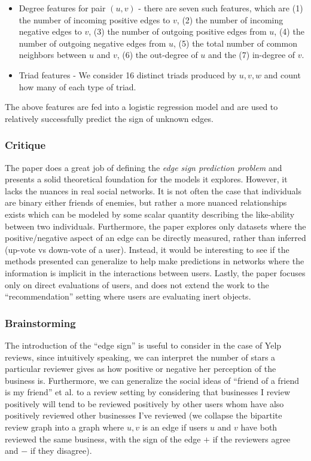 \documentclass[letterpaper, 11 pt, conference]{ieeeconf}  %
\begin{document}
\begin{itemize}
\item Degree features for pair $(u,v)$ - there are seven such features, which are (1) the number of incoming positive edges to $v$, (2) the number of incoming negative edges to $v$, (3) the number of outgoing positive edges from $u$, (4) the number of outgoing negative edges from $u$, (5) the total number of common neighbors between $u$ and $v$, (6) the out-degree of $u$ and the (7) in-degree of $v$.
\item Triad features - We consider 16 distinct triads produced by $u,v,w$ and count how many of each type of triad.
\end{itemize}

The above features are fed into a logistic regression model and are used to relatively successfully predict the sign of unknown edges.

\subsubsection{Critique}
The paper does a great job of defining the \textit{edge sign prediction problem} and presents a solid theoretical foundation for the models it explores. However, it lacks the nuances in real social networks. It is not often the case that individuals are binary either friends of enemies, but rather a more nuanced relationships exists which can be modeled by some scalar quantity describing the like-ability between two individuals. Furthermore, the paper explores only datasets where the positive/negative aspect of an edge can be directly measured, rather than inferred (up-vote vs down-vote of a user). Instead, it would be interesting to see if the methods presented can generalize to help make predictions in networks where the information is implicit in the interactions between users. Lastly, the paper focuses only on direct evaluations of users, and does not extend the work to the ``recommendation'' setting where users are evaluating inert objects.

\subsubsection{Brainstorming}

The introduction of the ``edge sign'' is useful to consider in the case of Yelp reviews, since intuitively speaking, we can interpret the number of stars a particular reviewer gives as how positive or negative her perception of the business is. Furthermore, we can generalize the social ideas of ``friend of a friend is my friend'' et al. to a review setting by considering that businesses I review positively will tend to be reviewed positively by other users whom have also positively reviewed other businesses I've reviewed (we collapse the bipartite review graph into a graph where $u,v$ is an edge if users $u$ and $v$ have both reviewed the same business, with the sign of the edge $+$ if the reviewers agree and $-$ if they disagree).
\end{document}
